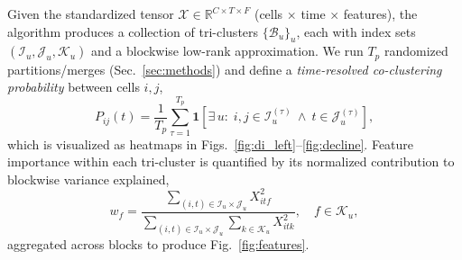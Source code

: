 \documentclass[unnumsec,webpdf,modern,large,namedate]{oup-authoring-template}%
\theoremstyle{thmstyleone}\newtheorem{theorem}{Theorem}
\theoremstyle{thmstyletwo}\newtheorem{example}{Example}
\theoremstyle{thmstylethree}\newtheorem{definition}{Definition}
\begin{document}
Given the standardized tensor $\mathcal{X}\in\mathbb{R}^{C\times T\times F}$ (cells $\times$ time $\times$ features), the algorithm produces a collection of tri-clusters $\{\mathcal{B}_u\}_u$, each with index sets $(\mathcal{I}_u,\mathcal{J}_u,\mathcal{K}_u)$ and a blockwise low-rank approximation. We run $T_p$ randomized partitions/merges (Sec.~\ref{sec:methods}) and define a \emph{time-resolved co-clustering probability} between cells $i,j$,
\begin{equation}
P_{ij}(t)=\frac{1}{T_p}\sum_{\tau=1}^{T_p}\mathbf{1}\!\left[\exists\,u:\; i,j\in\mathcal{I}_u^{(\tau)}\ \wedge\ t\in\mathcal{J}_u^{(\tau)}\right],
\label{eq:coclust_prob}
\end{equation}
which is visualized as heatmaps in Figs.~\ref{fig:di_left}--\ref{fig:decline}. Feature importance within each tri-cluster is quantified by its normalized contribution to blockwise variance explained,
\begin{equation}
w_f = \frac{\sum_{(i,t)\in\mathcal{I}_u\times\mathcal{J}_u} X_{itf}^2}{\sum_{(i,t)\in\mathcal{I}_u\times\mathcal{J}_u}\sum_{k\in\mathcal{K}_u} X_{itk}^2},\quad f\in\mathcal{K}_u,
\label{eq:feature_weight}
\end{equation}
aggregated across blocks to produce Fig.~\ref{fig:features}.
\end{document}
